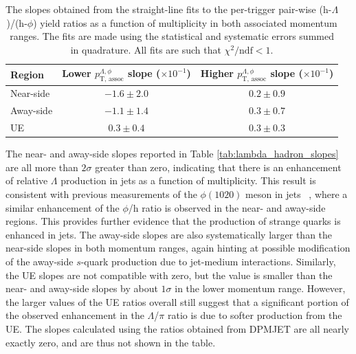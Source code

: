 \begin{table}
\centering
\caption{The slopes obtained from the straight-line fits to the per-trigger pair-wise (h-$\Lambda$)/(h-$\phi$) yield ratios as a function of multiplicity in both associated momentum ranges. The fits are made using the statistical and systematic errors summed in quadrature. All fits are such that $\chi^{2}/\text{ndf} < 1$.}
\begin{tabular}{l c c}
\hline
Region & Lower $p_{\text{T, assoc}}^{\Lambda, \phi}$ slope ($\times10^{-1}$) & Higher $p_{\text{T, assoc}}^{\Lambda, \phi}$ slope ($\times10^{-1}$) \\
\hline
Near-side & $ -1.6\pm 2.0$ & $0.2 \pm 0.9$ \\
Away-side & $ -1.1 \pm 1.4$ & $0.3 \pm 0.7$ \\
UE & $0.3 \pm 0.4$ & $0.3 \pm 0.3$ \\
\hline
\end{tabular}
\label{tab:lambda_phi_slopes}
\end{table}

The near- and away-side slopes reported in Table \ref{tab:lambda_hadron_slopes} are all more than $2\sigma$ greater than zero, indicating that there is an enhancement of relative $\Lambda$ production in jets as a function of multiplicity. This result is consistent with previous measurements of the $\phi(1020)$ meson in jets ~\cite{JustinPaper}, where a similar enhancement of the $\phi$/h ratio is observed in the near- and away-side regions. This provides further evidence that the production of strange quarks is enhanced in jets. The away-side slopes are also systematically larger than the near-side slopes in both momentum ranges, again hinting at possible modification of the away-side $s$-quark production due to jet-medium interactions. Similarly, the UE slopes are not compatible with zero, but the value is smaller than the near- and away-side slopes by about $1\sigma$ in the lower momentum range. However, the larger values of the UE ratios overall still suggest that a significant portion of the observed enhancement in the $\Lambda$/$\pi$ ratio is due to softer production from the UE. The slopes calculated using the ratios obtained from DPMJET are all nearly exactly zero, and are thus not shown in the table.